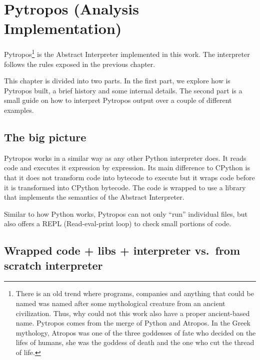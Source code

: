 \chapter{Pytropos (Analysis Implementation)}%
\label{pytropos-analysis-implementation}

Pytropos\footnote{There is an old trend where programs, companies and
  anything that could be named was named after some mythological
  creature from an ancient civilization. Thus, why could not this work
  also have a proper ancient-based name. Pytropos comes from the merge
  of Python and Atropos. In the Greek mythology, Atropos was one of the
  three goddesses of fate who decided on the lifes of humans, she was
  the goddess of death and the one who cut the thread of life.} is the
Abstract Interpreter implemented in this work. The interpreter follows
the rules exposed in the previous chapter.

This chapter is divided into two parts. In the first part, we explore
how is Pytropos built, a brief history and some internal details. The
second part is a small guide on how to interpret Pytropos output over a
couple of different examples.

\section{The big picture}\label{the-big-picture}

{}

Pytropos works in a similar way as any other Python interpreter does. It
reads code and executes it expression by expression. Its main difference
to CPython is that it does not transform code into bytecode to execute
but it wraps code before it is transformed into CPython bytecode. The
code is wrapped to use a library that implements the semantics of the
Abstract Interpreter.

Similar to how Python works, Pytropos can not only \enquote{run}
individual files, but also offers a REPL (Read-eval-print loop) to check
small portions of code.

\section{Wrapped code + libs + interpreter vs.~from scratch interpreter}%
\label{wrapped-code-libs-interpreter-vs.from-scratch-interpreter}

{}

